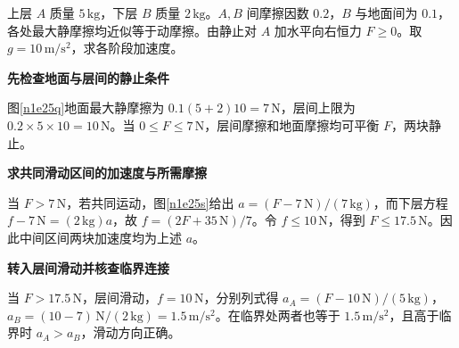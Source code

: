 \begin{question}\begin{example}[粗糙地面上拉上层物块]\label{n1e25}
上层 $A$ 质量 $5\,\mathrm{kg}$，下层 $B$ 质量 $2\,\mathrm{kg}$。$A,B$ 间摩擦因数 $0.2$，$B$ 与地面间为 $0.1$，各处最大静摩擦均近似等于动摩擦。由静止对 $A$ 加水平向右恒力 $F\ge0$。取 $g=10\,\mathrm{m/s^2}$，求各阶段加速度。
\end{example}\end{question}
\begin{solution}\textbf{先检查地面与层间的静止条件}\par\nobreak
图\ref{n1e25q}地面最大静摩擦为 $0.1(5+2)10=7\,\mathrm N$，层间上限为 $0.2\times5\times10=10\,\mathrm N$。当 $0\le F\le7\,\mathrm N$，层间摩擦和地面摩擦均可平衡 $F$，两块静止。



\par\medskip{}\noindent\textbf{求共同滑动区间的加速度与所需摩擦}\par\nobreak
当 $F>7\,\mathrm N$，若共同运动，图\ref{n1e25s}给出 $a=(F-7\,\mathrm N)/(7\,\mathrm{kg})$，而下层方程 $f-7\,\mathrm N=(2\,\mathrm{kg})a$，故 $f=(2F+35\,\mathrm N)/7$。令 $f\le10\,\mathrm N$，得到 $F\le17.5\,\mathrm N$。因此中间区间两块加速度均为上述 $a$。



\par\medskip{}\noindent\textbf{转入层间滑动并核查临界连接}\par\nobreak
当 $F>17.5\,\mathrm N$，层间滑动，$f=10\,\mathrm N$，分别列式得 $a_A=(F-10\,\mathrm N)/(5\,\mathrm{kg})$，$a_B=(10-7)\,\mathrm N/(2\,\mathrm{kg})=1.5\,\mathrm{m/s^2}$。在临界处两者也等于 $1.5\,\mathrm{m/s^2}$，且高于临界时 $a_A>a_B$，滑动方向正确。
\end{solution}

